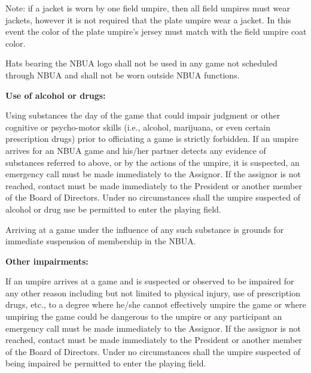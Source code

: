 \documentclass[letterpaper,11pt,colorlinks=true,allcolors=blue]{article}
\begin{document}
Note: if a jacket is worn by one field umpire, then all field umpires must wear jackets, however it is not required that the plate umpire wear a jacket. In this event the color of the plate umpire's jersey must match with the field umpire coat color. 

Hats bearing the NBUA logo shall not be used in any game not scheduled through NBUA and shall not be worn outside NBUA functions.

\newpage
\begin{flushleft}\textbf{Use of alcohol or drugs:}\end{flushleft}
Using substances the day of the game that could impair judgment or other cognitive or psycho-motor skills (i.e., alcohol, marijuana, or even certain prescription drugs) prior to officiating a game is strictly forbidden. If an umpire arrives for an NBUA game and his/her partner detects any evidence of substances referred to above, or by the actions of the umpire, it is suspected, an emergency call must be made immediately to the Assignor.  If the assignor is not reached, contact must be made immediately to the President or another member of the Board of Directors. Under no circumstances shall the umpire suspected of alcohol or drug use be permitted to enter the playing field. 

Arriving at a game under the influence of any such substance is grounds for immediate suspension of membership in the NBUA.

\begin{flushleft}\textbf{Other impairments:}\end{flushleft}
If an umpire arrives at a game and is suspected or observed to be impaired for any other reason including but not limited to physical injury, use of prescription drugs, etc., to a degree where he/she cannot effectively umpire the game or where umpiring the game could be dangerous to the umpire or any participant an emergency call must be made immediately to the Assignor.  If the assignor is not reached, contact must be made immediately to the President or another member of the Board of Directors. Under no circumstances shall the umpire suspected of being impaired be permitted to enter the playing field. 
\end{document}
